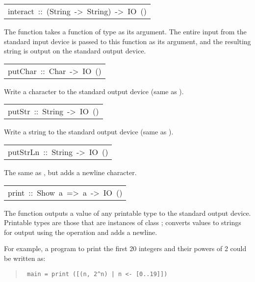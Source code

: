 \begin{haddockdesc}
\item[\begin{tabular}{@{}l}
interact\ ::\ (String\ ->\ String)\ ->\ IO\ ()
\end{tabular}]\haddockbegindoc
The  function takes a function of type 
 as its argument.  The entire input from the standard input device is
 passed to this function as its argument, and the resulting string is
 output on the standard output device.
\par

\end{haddockdesc}
\begin{haddockdesc}
\item[\begin{tabular}{@{}l}
putChar\ ::\ Char\ ->\ IO\ ()
\end{tabular}]\haddockbegindoc
Write a character to the standard output device
 (same as  ).
\par

\end{haddockdesc}
\begin{haddockdesc}
\item[\begin{tabular}{@{}l}
putStr\ ::\ String\ ->\ IO\ ()
\end{tabular}]\haddockbegindoc
Write a string to the standard output device
 (same as  ).
\par

\end{haddockdesc}
\begin{haddockdesc}
\item[\begin{tabular}{@{}l}
putStrLn\ ::\ String\ ->\ IO\ ()
\end{tabular}]\haddockbegindoc
The same as , but adds a newline character.
\par

\end{haddockdesc}
\begin{haddockdesc}
\item[\begin{tabular}{@{}l}
print\ ::\ Show\ a\ =>\ a\ ->\ IO\ ()
\end{tabular}]\haddockbegindoc
The  function outputs a value of any printable type to the
 standard output device.
 Printable types are those that are instances of class ; 
 converts values to strings for output using the  operation and
 adds a newline.
\par
For example, a program to print the first 20 integers and their
 powers of 2 could be written as:
\par
\begin{quote}
{\haddockverb\begin{verbatim}
 main = print ([(n, 2^n) | n <- [0..19]])
\end{verbatim}}
\end{quote}

\end{haddockdesc}
